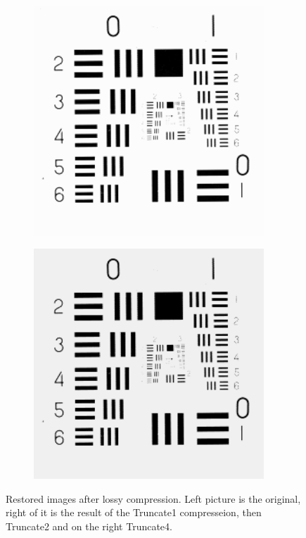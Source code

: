 \begin{figure}
\begin{subfigure}[b]{.23\textwidth}
  \caption{}
  \label{fig:test-images-resolutionchart-truncate1}
\end{subfigure}
\begin{subfigure}[b]{.23\textwidth}
  \centering
  \includegraphics[width=0.95\textwidth]{figures/test-images/truncate2/resolutionchart}
  \caption{}
  \label{fig:test-images-resolutionchart-truncate2}
\end{subfigure}
\begin{subfigure}[b]{.23\textwidth}
  \centering
  \includegraphics[width=0.95\textwidth]{figures/test-images/truncate4/resolutionchart}
  \caption{}
  \label{fig:test-images-resolutionchart-truncate4}
\end{subfigure}

\caption{Restored images after lossy compression. Left picture is the original, right of it is the result of the Truncate1 compresseion, then Truncate2 and on the right Truncate4.}
\label{fig:test-images-restored}
\end{figure}
